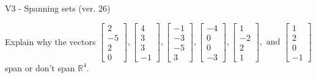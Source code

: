 \begin{exercise}
  \begin{exerciseTitle}V3 - Spanning sets (ver. 26)\end{exerciseTitle}
  \begin{exerciseStatement}
    Explain why the vectors \(\left[\begin{array}{r}
2 \\
-5 \\
2 \\
0
\end{array}\right] , \left[\begin{array}{r}
4 \\
3 \\
3 \\
-1
\end{array}\right] , \left[\begin{array}{r}
-1 \\
-3 \\
-5 \\
3
\end{array}\right] , \left[\begin{array}{r}
-4 \\
0 \\
0 \\
-3
\end{array}\right] , \left[\begin{array}{r}
1 \\
-2 \\
2 \\
1
\end{array}\right] , \text{ and } \left[\begin{array}{r}
1 \\
2 \\
0 \\
-1
\end{array}\right]\) span or don't span \(\mathbb{R}^4\). 
	



\end{exerciseStatement}
\end{exercise}
